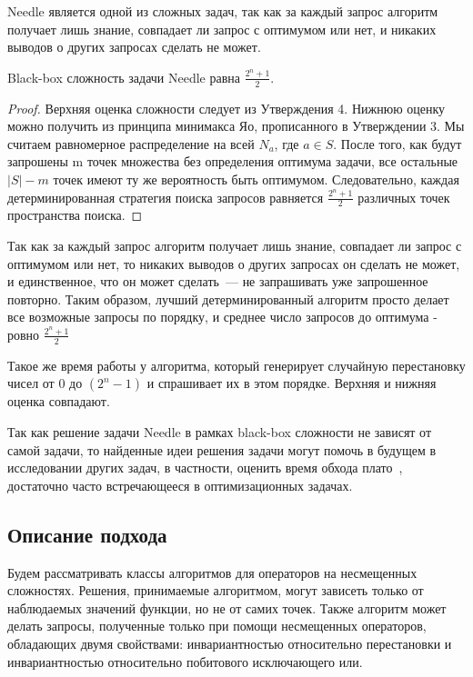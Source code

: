 Needle является одной из сложных задач, так как за каждый запрос алгоритм получает лишь знание, совпадает ли запрос с оптимумом или нет, и никаких выводов о других запросах сделать не может. 

\begin{myth}
Black-box сложность задачи Needle равна $\frac{2^n + 1}{2}$.
\end{myth}
\begin{proof}
    Верхняя оценка сложности следует из Утверждения 4. Нижнюю оценку можно получить из принципа минимакса Яо, прописанного в Утверждении 3.
    Мы считаем равномерное распределение на всей $N_a$, где $a \in S$. После того, как будут запрошены m точек множества без определения оптимума задачи, все остальные $|S| - m$
    точек имеют ту же вероятность быть оптимумом. Следовательно, каждая детерминированная стратегия поиска запросов равняется $\frac{2^n + 1}{2}$ различных точек пространства поиска.
\end{proof}

Так как за каждый запрос алгоритм получает лишь знание, совпадает ли запрос с оптимумом или нет, то никаких выводов о других запросах он сделать не может, и единственное, что он может сделать~--- не 
запрашивать уже запрошенное повторно. Таким образом, лучший детерминированный алгоритм просто делает все возможные запросы по порядку, и среднее число запросов до оптимума - ровно $\frac{2^n + 1}{2}$

Такое же время работы у алгоритма, который генерирует случайную перестановку чисел от 0 до $(2^n - 1)$ и спрашивает их в этом порядке. Верхняя и нижняя оценка совпадают.

Так как решение задачи Needle в рамках black-box сложности не зависят от самой задачи, то найденные идеи решения задачи могут помочь в будущем в исследовании других задач, в частности,
оценить время обхода плато~\cite{7}, достаточно часто встречающееся в оптимизационных задачах. 

\subsection{Описание подхода}

Будем рассматривать классы алгоритмов для операторов на несмещенных сложностях. Решения, принимаемые алгоритмом, могут зависеть только от наблюдаемых значений функции, но не от самих точек. 
Также алгоритм может делать запросы, полученные только при помощи несмещенных операторов, обладающих двумя свойствами: инвариантностью относительно перестановки и инвариантностью относительно 
побитового исключающего или. 
	
